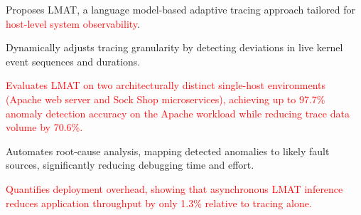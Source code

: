 \documentclass[preprint,12pt]{elsarticle}
\begin{document}
\begin{frontmatter}
\begin{abstract}
Additionally, LMAT utilizes prediction discrepancies to drive an efficient root-cause classifier, mapping detected anomalies directly to their potential fault sources and providing actionable feedback for operations teams. \textcolor{red}{We evaluate LMAT on two architecturally distinct single-host environments---an Apache2 web-server stack and the Sock Shop containerized microservice benchmark---using kernel traces that include standard workloads, duration-centric noise scenarios, and controlled CPU, disk, memory, and network stress injections.} \textcolor{red}{On the Apache workload,} LMAT demonstrates up to \textbf{97.7\%} accuracy in anomaly detection and root-cause identification, surpassing state-of-the-art methods relying solely on event sequences. \textcolor{red}{On Sock Shop, the same design remains effective for host-local change detection, while root-cause attribution in the microservice setting remains more challenging. A deployment-oriented overhead study further shows that asynchronous LMAT inference increases P95 latency by 13.0\% and reduces throughput by 1.3\% relative to tracing alone.} Our findings illustrate that LMAT offers a practical, sustainable, and AI-driven solution for adaptive tracing \textcolor{red}{in the evaluated single-host environments}.
Our findings illustrate that LMAT is a practical approach for adaptive tracing in the evaluated single-host environments, improving detection quality while keeping deployment overhead modest.

\end{abstract}



\begin{highlights}
\item Proposes LMAT, a language model-based adaptive tracing approach tailored for \textcolor{red}{host-level system observability}.
\item Dynamically adjusts tracing granularity by detecting deviations in live kernel event sequences and durations.
\item \textcolor{red}{Evaluates LMAT on two architecturally distinct single-host environments (Apache web server and Sock Shop microservices), achieving up to 97.7\% anomaly detection accuracy on the Apache workload while reducing trace data volume by 70.6\%.}
\item Automates root-cause analysis, mapping detected anomalies to likely fault sources, significantly reducing debugging time and effort.
\item \textcolor{red}{Quantifies deployment overhead, showing that asynchronous LMAT inference reduces application throughput by only 1.3\% relative to tracing alone.}
\end{highlights}



\end{frontmatter}
\end{document}
